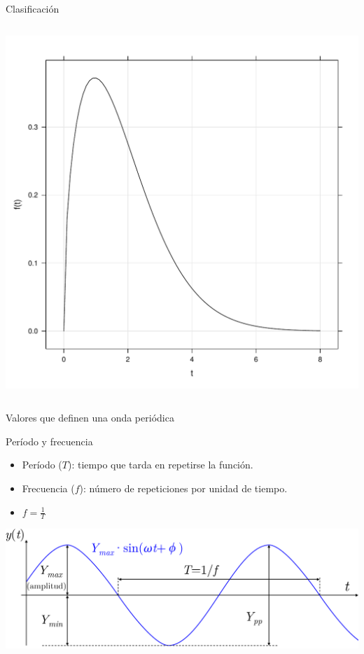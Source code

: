 \documentclass[aspectratio=169, usenames,svgnames,dvipsnames]{beamer}
\begin{document}
\begin{frame}[label={sec:org14e8bd7}]{Clasificación}
\begin{columns}
\begin{column}{0.5\columnwidth}
\begin{center}
\includegraphics[height=0.52\textheight]{../figs/no_periodica.pdf}
\end{center}
\end{column}
\end{columns}
\end{frame}


\begin{frame}[label={sec:org2e160d0}]{Valores que definen una onda periódica}
\begin{block}{Período y frecuencia}
\begin{itemize}
\item Período (\(T\)): tiempo que tarda en repetirse la función.
\item Frecuencia (\(f\)): número de repeticiones por unidad de tiempo.
\item \(f = \frac{1}{T}\)
\end{itemize}
\end{block}
\begin{center}
\includegraphics[width=.9\linewidth]{../figs/Senoidal_parametros.pdf}
\end{center}
\end{frame}
\end{document}
